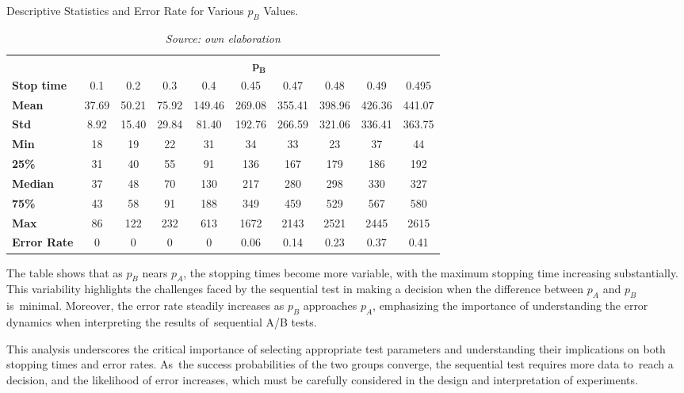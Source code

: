 \documentclass[magisterska, english]{pwr_wmat_praca_dyplomowa}
\theoremstyle{plain}
\numberwithin{theorem}{chapter}
\theoremstyle{definition}
\numberwithin{theorem}{chapter}
\begin{document}
\begin{table}[H]
	\centering
	\caption{Descriptive Statistics and Error Rate for Various \( p_B \) Values.}
	\label{tab:descriptive_stats}
	\begin{tabular}{lccccccccc}
		\toprule
		& \multicolumn{9}{c}{\( \mathbf{p_B} \)} \\ \cmidrule(lr){2-10}
		\textbf{Stop time}& 0.1 & 0.2 & 0.3 & 0.4 & 0.45 & 0.47 & 0.48 & 0.49 & 0.495 \\
		\midrule
		\textbf{Mean} & 37.69 & 50.21 & 75.92 & 149.46 & 269.08 & 355.41 & 398.96 & 426.36 & 441.07 \\
		\textbf{Std} & 8.92 & 15.40 & 29.84 & 81.40 & 192.76 & 266.59 & 321.06 & 336.41 & 363.75 \\
		\textbf{Min} & 18 & 19 & 22 & 31 & 34 & 33 & 23 & 37 & 44 \\
		\textbf{25\%} & 31 & 40 & 55 & 91 & 136 & 167 & 179 & 186 & 192 \\
		\textbf{Median} & 37 & 48 & 70 & 130 & 217 & 280 & 298 & 330 & 327 \\
		\textbf{75\%} & 43 & 58 & 91 & 188 & 349 & 459 & 529 & 567 & 580 \\
		\textbf{Max} & 86 & 122 & 232 & 613 & 1672 & 2143 & 2521 & 2445 & 2615 \\
		\hline
		\textbf{Error Rate} & 0 & 0 & 0 & 0 & 0.06 & 0.14 & 0.23 & 0.37 & 0.41 \\
		\bottomrule
	\end{tabular}
	\caption*{\textit{Source: own elaboration}}
\end{table}

The table shows that as \( p_B \) nears \( p_A \), the stopping times become more variable, with the maximum stopping time increasing substantially. This variability highlights the challenges faced by the sequential test in making a decision when the difference between \( p_A \) and \( p_B \) is~minimal. Moreover, the error rate steadily increases as \( p_B \) approaches \( p_A \), emphasizing the importance of understanding the error dynamics when interpreting the results of~sequential A/B tests.

This analysis underscores the critical importance of selecting appropriate test parameters and understanding their implications on both stopping times and error rates. As~the success probabilities of the two groups converge, the sequential test requires more data to~reach a decision, and the likelihood of error increases, which must be carefully considered in the design and interpretation of experiments.
\end{document}
